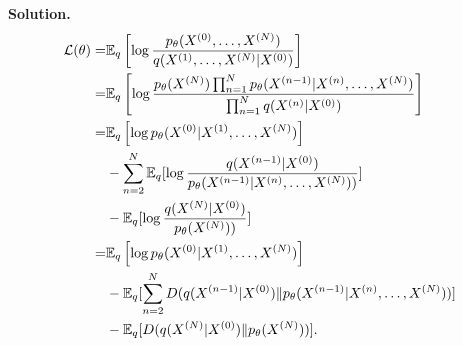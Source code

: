 \documentclass[12pt]{article}
\begin{document}
\begin{enumerate}
\begin{solution}
\textbf{Solution.}\\
\begin{align*}
    {\cal L}(\theta) =& \mathbb{E}_{q} \left[\log\frac{p_{\theta}(X^{(0)}, \dots, X^{(N)})}{q(X^{(1)}, \dots, X^{(N)}|X^{(0)})}\right]\\
    =& \mathbb{E}_{q} \left[\log\frac{p_{\theta}(X^{(N)}) \prod_{n=1}^N p_{\theta}(X^{(n-1)}|X^{(n)}, \dots, X^{(N)})}{\prod_{n=1}^Nq(X^{(n)}|X^{(0)})}\right]\\
    =&\mathbb{E}_{q} \left[\log p_{\theta}(X^{(0)}|X^{(1)}, \dots, X^{(N)})\right]\nonumber\\
    &-\sum_{n=2}^N \mathbb{E}_q[\log \frac{q(X^{(n-1)}|X^{(0)})}{p_\theta(X^{(n-1)}|X^{(n)},\dots, X^{(N)}))}]\nonumber\\
    &-\mathbb{E}_q[\log \frac{q(X^{(N)}|X^{(0)})}{p_\theta(X^{(N)}))}]\\
    =&\mathbb{E}_{q} \left[\log p_{\theta}(X^{(0)}|X^{(1)}, \dots, X^{(N)})\right]\nonumber\\
    &-\mathbb{E}_q[\sum_{n=2}^N D(q(X^{(n-1)}|X^{(0)})\| p_\theta(X^{(n-1)}|X^{(n)},\dots, X^{(N)}))]\nonumber\\
    &-\mathbb{E}_q[D(q(X^{(N)}|X^{(0)})\|p_\theta(X^{(N)}))].
\end{align*}
\end{solution}




\begin{problem}
\end{problem}


\end{enumerate}
\end{document}
